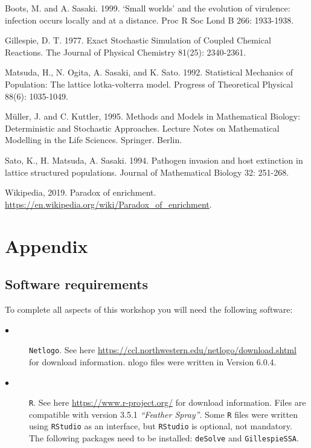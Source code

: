 \documentclass[11pt, oneside]{article}   	%
\begin{document}
\begin{thebibliography}{10}

 Boots, M. and A. Sasaki. 1999. `Small worlds' and the evolution of virulence: infection occurs locally and at a distance. Proc R Soc Lond B 266: 1933-1938.

 Gillespie, D. T. 1977. Exact Stochastic Simulation of Coupled Chemical Reactions. The Journal of Physical Chemistry 81(25): 2340-2361.

 Matsuda, H., N. Ogita, A. Sasaki, and K. Sato. 1992. Statistical Mechanics of Population: The lattice lotka-volterra model. Progress of Theoretical Physical 88(6):  1035-1049.

M\"uller, J. and C. Kuttler, 1995. Methods and Models in Mathematical Biology: Deterministic and Stochastic Approaches. Lecture Notes on Mathematical Modelling in the Life Sciences. Springer. Berlin.

 Sato, K.,  H. Matsuda, A. Sasaki. 1994. Pathogen invasion and host extinction in lattice structured populations. Journal of Mathematical Biology 32: 251-268.

 Wikipedia, 2019. Paradox of enrichment. \url{https://en.wikipedia.org/wiki/Paradox_of_enrichment}.

\end{thebibliography}
\newpage
\renewcommand\appendix{\clearpage\pagenumbering{arabic}\origappendix}
\renewcommand{\theequation}{A.\arabic{equation}}
\setcounter{equation}{0} 
\renewcommand{\thefigure}{A.\arabic{figure}}
\setcounter{figure}{0} 
\renewcommand{\thetable}{A.\arabic{table}}
\setcounter{table}{0} 
\setcounter{section}{0} 
\renewcommand{\thesection}{A.\arabic{section}}
\section{Appendix}\label{sec:Appendix}
\subsection{Software requirements}
\label{sec:software}
To complete all aspects of this workshop you will need the following software:
\begin{description}
\item[$\bullet$] \texttt{Netlogo}. See here \url{https://ccl.northwestern.edu/netlogo/download.shtml} for download information. nlogo files were written in Version 6.0.4.
\item[$\bullet$] \texttt{R}. See here \url{https://www.r-project.org/} for download information. Files are compatible with version 3.5.1 \emph{``Feather Spray''}. Some \texttt{R} files were written using \texttt{RStudio} as an interface, but \texttt{RStudio} is optional, not mandatory. The following packages need to be installed: \texttt{deSolve} and \texttt{GillespieSSA}.
\end{description}
\end{document}
